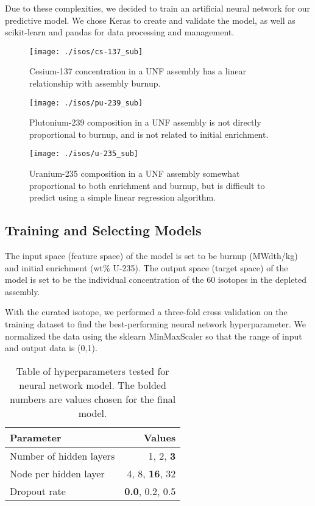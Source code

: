 Due to these complexities, we decided to train an artificial
neural network for our predictive model. We chose
Keras to create and validate the model, as well as scikit-learn
and pandas for data processing and management.

\begin{figure}
    \centering
    \texttt{[image: ./isos/cs-137\_sub]}
    \caption{Cesium-137 concentration in a \gls{UNF} assembly
             has a linear relationship with assembly burnup.}
    \label{fig:cs_137}
\end{figure}


\begin{figure}
    \centering
    \texttt{[image: ./isos/pu-239\_sub]}
    \caption{Plutonium-239 composition in a \gls{UNF} assembly
             is not directly proportional to burnup, and is
             not related to initial enrichment.}
    \label{fig:pu_239}
\end{figure}
\begin{figure}
    \centering
    \texttt{[image: ./isos/u-235\_sub]}
    \caption{Uranium-235 composition in a \gls{UNF} assembly
             somewhat proportional to both enrichment and
             burnup, but is difficult to predict using
             a simple linear regression algorithm.}
    \label{fig:u_235}
\end{figure}


\subsection{Training and Selecting Models}

The input space (feature space) of the model is set to
be burnup (MWdth/kg) and initial enrichment (wt\% U-235).
The output space (target space) of the model is set to
be the individual concentration of the 60 isotopes in the
depleted assembly.

With the curated isotope, we performed a three-fold
cross validation on the training dataset to find the
best-performing neural network hyperparameter. We
normalized the data using the sklearn MinMaxScaler
so that the range of input and output data is (0,1).

\begin{table}[h]
    \centering
    \begin{tabular}{lr}
        \hline
        Parameter & Values \\
        \hline
        Number of hidden layers & 1, 2, \textbf{3} \\
        Node per hidden layer & 4, 8, \textbf{16}, 32 \\
        Dropout rate & \textbf{0.0}, 0.2, 0.5 \\
        \hline
    \end{tabular}
    \caption{Table of hyperparameters tested
             for neural network model. The bolded
             numbers are values chosen for the final model.}
\end{table}

